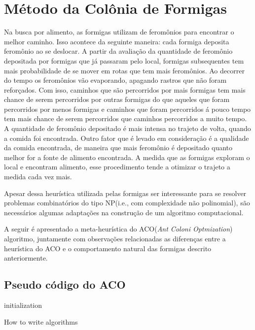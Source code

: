 \section{Método da Colônia de Formigas}

Na busca por alimento, as formigas utilizam de feromônios para encontrar o melhor caminho.
Isso acontece da seguinte maneira: cada formiga deposita feromônio ao se deslocar. A partir
da avaliação da quantidade de feromônio depositada por formigas que já passaram pelo local,
formigas subsequentes tem mais probabilidade de se mover em rotas que tem mais feromônios. Ao
decorrer do tempo os feromônios vão evaporando, apagando rastros que não foram reforçados. 
Com isso, caminhos que são percorridos por mais formigas tem mais chance de serem 
percorridos por outras formigas do que aqueles que foram percorridos por menos formigas e 
caminhos que foram percorridos á pouco tempo tem mais chance de serem percorridos que caminhos
percorridos a muito tempo. A quantidade de feromônio depositado é mais intensa no trajeto de volta,
quando a comida foi encontrada. Outro fator que é levado em consideração é a qualidade da comida
encontrada, de maneira que mais feromônio é depositado quanto melhor for a fonte de alimento encontrada.
A medida que as formigas exploram o local e encontram alimento, esse procedimento tende a otimizar o
trajeto a medida cada vez mais.

Apesar dessa heurística utilizada pelas formigas ser interessante para se resolver problemas combinatórios 
do tipo NP(i.e., com complexidade não polinomial), são necessários algumas adaptações na construção
de um algoritmo computacional.

A seguir é apresentado a meta-heurística do ACO(\textit{Ant Coloni Optmization}) algoritmo, juntamente com observações relacionadas as diferenças
entre a heurística do ACO e o comportamento natural das formigas descrito anteriormente.

\subsection{Pseudo código do ACO}

\begin{algorithm}[H]
\SetAlgoLined
{}
initialization\;
\caption{How to write algorithms}
\end{algorithm}
